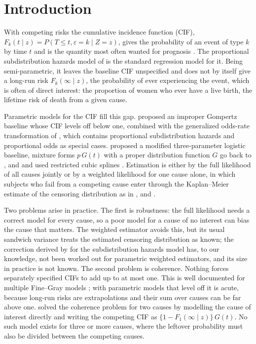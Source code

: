 \documentclass[11pt]{article}
\begin{document}
\section{Introduction}\label{sec:intro}
With competing risks the cumulative incidence function (CIF), $F_k(t \mid z) = P(T \le t, \varepsilon = k \mid Z = z)$,
gives the probability of an event of type $k$ by time $t$ and is the quantity most often wanted
for prognosis \citep{putter2007,andersen2012}. The proportional subdistribution hazards model of
\citet{fine1999} is the standard regression model for it. Being semi-parametric, it leaves the
baseline CIF unspecified and does not by itself give a long-run risk $F_k(\infty \mid z)$, the
probability of ever experiencing the event, which is often of direct interest: the proportion of
women who ever have a live birth, the lifetime risk of death from a given cause.

Parametric models for the CIF fill this gap. \citet{jeong2006,jeong2007} proposed an improper
Gompertz baseline whose CIF levels off below one, combined with the generalized odds-rate
transformation of \citet{dabrowska1988}, which contains proportional subdistribution hazards and
proportional odds as special cases. \citet{cheng2009} proposed a modified three-parameter logistic
baseline, mixture forms $p\,G(t)$ with a proper distribution function $G$ go back to
\citet{larson1985}, and \citet{lambert2017} and \citet{mozumder2018} used restricted cubic splines
\citep{royston2002}. Estimation is either by the full likelihood of all causes jointly
\citep{jeong2007,mozumder2018} or by a weighted likelihood for one cause alone, in which subjects
who fail from a competing cause enter through the Kaplan--Meier estimate of the censoring
distribution as in \citet{fine1999}, \citet{geskus2011} and \citet{lambert2017}.

Two problems arise in practice. The first is robustness: the full likelihood needs a correct model
for every cause, so a poor model for a cause of no interest can bias the cause that matters. The
weighted estimator avoids this, but its usual sandwich variance treats the estimated censoring
distribution as known; the correction derived by \citet{fine1999} for the subdistribution hazards
model has, to our knowledge, not been worked out for parametric weighted estimators, and its size
in practice is not known. The second problem is coherence. Nothing forces separately specified
CIFs to add up to at most one. This is well documented for multiple Fine--Gray models
\citep{austin2021,bonneville2024}; with parametric models that level off it is acute, because
long-run risks are extrapolations and their sum over causes can be far above one.
\citet{shi2013} solved the coherence problem for two causes by modelling the cause of interest
directly and writing the competing CIF as $\{1 - F_1(\infty \mid z)\}\,G(t)$. No such model exists
for three or more causes, where the leftover probability must also be divided between the
competing causes.
\end{document}
